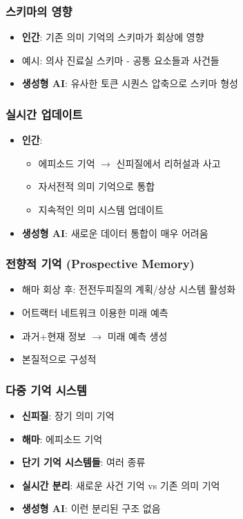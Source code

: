 \documentclass[openany]{book}
\begin{document}
\begin{appendices}
\subsubsection{스키마의 영향}
\begin{itemize}
\item \textbf{인간}: 기존 의미 기억의 스키마가 회상에 영향
\item 예시: 의사 진료실 스키마 - 공통 요소들과 사건들
\item \textbf{생성형 AI}: 유사한 토큰 시퀀스 압축으로 스키마 형성
\end{itemize}

\subsubsection{실시간 업데이트}
\begin{itemize}
\item \textbf{인간}: 
  \begin{itemize}
  \item 에피소드 기억 $\rightarrow$ 신피질에서 리허설과 사고
  \item 자서전적 의미 기억으로 통합
  \item 지속적인 의미 시스템 업데이트
  \end{itemize}
\item \textbf{생성형 AI}: 새로운 데이터 통합이 매우 어려움
\end{itemize}

\subsubsection{전향적 기억 (Prospective Memory)}
\begin{itemize}
\item 해마 회상 후: 전전두피질의 계획/상상 시스템 활성화
\item 어트랙터 네트워크 이용한 미래 예측
\item 과거+현재 정보 $\rightarrow$ 미래 예측 생성
\item 본질적으로 구성적
\end{itemize}

\subsubsection{다중 기억 시스템}
\begin{itemize}
\item \textbf{신피질}: 장기 의미 기억
\item \textbf{해마}: 에피소드 기억
\item \textbf{단기 기억 시스템들}: 여러 종류
\item \textbf{실시간 분리}: 새로운 사건 기억 vs 기존 의미 기억
\item \textbf{생성형 AI}: 이런 분리된 구조 없음
\end{itemize}


\end{appendices}
\end{document}
